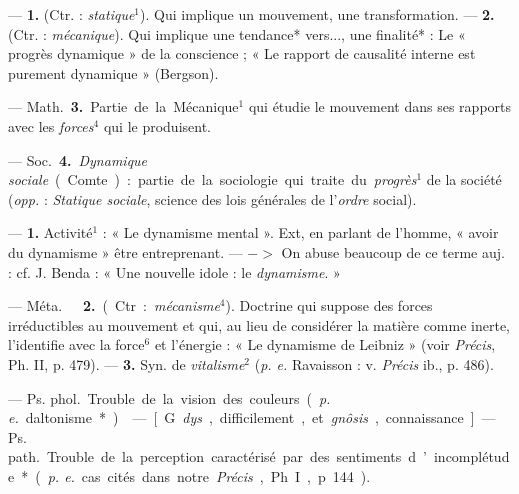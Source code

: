 \begin{itemize}[leftmargin=1cm, label=, itemsep=1pt]
 — {\bf 1.} (Ctr. : {\it statique}$^1$). Qui implique un mouvement, une transformation. — {\bf 2.}
(Ctr. : {\it mécanique}). Qui implique une
tendance* vers..., une finalité* : Le
« progrès dynamique » de la conscience ; « Le rapport de causalité
interne est purement dynamique »
(Bergson).

 — \si{Math.} {\bf 3.} Partie
de la Mécanique$^1$ qui étudie le mouvement dans ses rapports avec les
{\it forces}$^4$ qui le produisent.

— \si{Soc.} {\bf 4.} {\it Dynamique sociale}
(Comte) : partie de la sociologie qui
traite du {\it progrès}$^1$ de la société ({\it opp.} :
{\it Statique sociale}, science des lois
générales de l’{\it ordre} social).

 — {\bf 1.}  Activité$^1$ : « Le
dynamisme mental ». Ext, en parlant de l’homme, « avoir du dynamisme » être entreprenant. —
$->$ On abuse beaucoup de ce terme
auj. : cf. J. Benda : « Une nouvelle
idole : le {\it dynamisme}. »

— \si{Méta.}   {\bf 2.}
(Ctr. : {\it mécanisme}$^4$). Doctrine qui suppose des
forces irréductibles au mouvement et qui, au lieu de considérer la
matière comme inerte, l'identifie
avec la force$^6$ et l'énergie : « Le
dynamisme de Leibniz » (voir  {\it Précis},
Ph. II, p. 479). — {\bf 3.} Syn. de {\it vitalisme}$^2$ ({\it p. e.} Ravaisson : v.  {\it Précis}
ib., p. 486).

 — \si{Ps. phol.} Trouble
de la vision des couleurs ({\it p. e.} daltonisme*).

 — [G. {\it dys}, difficilement, et
{\it gnôsis}, connaissance] — \si{Ps. path.}
Trouble de la perception caractérisé 
par des sentiments d’incomplétude*
({\it p. e.} cas cités dans notre  {\it Précis},
Ph. I, p. 144).

	\end{itemize}
